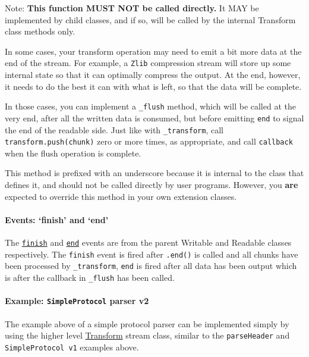 Note: \textbf{This function MUST NOT be called directly.} It MAY be
implemented by child classes, and if so, will be called by the internal
Transform class methods only.

In some cases, your transform operation may need to emit a bit more data
at the end of the stream. For example, a \texttt{Zlib} compression
stream will store up some internal state so that it can optimally
compress the output. At the end, however, it needs to do the best it can
with what is left, so that the data will be complete.

In those cases, you can implement a \texttt{\_flush} method, which will
be called at the very end, after all the written data is consumed, but
before emitting \texttt{end} to signal the end of the readable side.
Just like with \texttt{\_transform}, call \texttt{transform.push(chunk)}
zero or more times, as appropriate, and call \texttt{callback} when the
flush operation is complete.

This method is prefixed with an underscore because it is internal to the
class that defines it, and should not be called directly by user
programs. However, you \textbf{are} expected to override this method in
your own extension classes.

\paragraph{\texorpdfstring{Events: `finish' and
`end'}{Events: finish and end}}\label{events-finish-and-end}

The \hyperref[streamux5feventux5ffinish]{\texttt{finish}} and
\hyperref[streamux5feventux5fend]{\texttt{end}} events are from the
parent Writable and Readable classes respectively. The \texttt{finish}
event is fired after \texttt{.end()} is called and all chunks have been
processed by \texttt{\_transform}, \texttt{end} is fired after all data
has been output which is after the callback in \texttt{\_flush} has been
called.

\paragraph{\texorpdfstring{Example: \texttt{SimpleProtocol} parser
v2}{Example: SimpleProtocol parser v2}}\label{example-simpleprotocol-parser-v2}

The example above of a simple protocol parser can be implemented simply
by using the higher level
\hyperref[streamux5fclassux5fstreamux5ftransform]{Transform} stream
class, similar to the \texttt{parseHeader} and
\texttt{SimpleProtocol\ v1} examples above.

